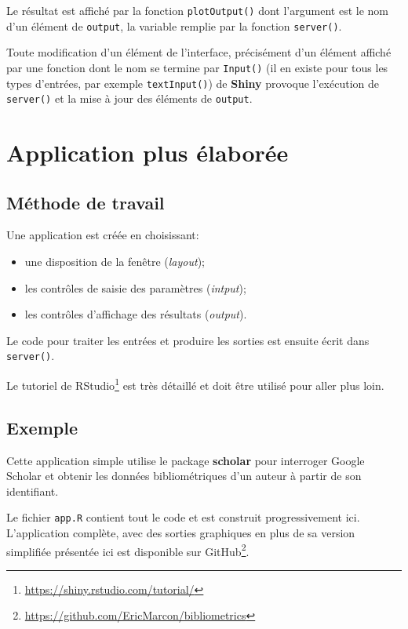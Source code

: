 \documentclass[
  12pt,
  french,
  a4paper,
  extrafontsizes,onecolumn,openright
  ]{memoir}
\providecommand{\tightlist}{%
  \setlength{\itemsep}{0pt}\setlength{\parskip}{0pt}}
\newlength{\rf}
\begin{document}
Le résultat est affiché par la fonction \texttt{plotOutput()} dont l'argument est le nom d'un élément de \texttt{output}, la variable remplie par la fonction \texttt{server()}.

Toute modification d'un élément de l'interface, précisément d'un élément affiché par une fonction dont le nom se termine par \texttt{Input()} (il en existe pour tous les types d'entrées, par exemple \texttt{textInput()}) de \textbf{Shiny} provoque l'exécution de \texttt{server()} et la mise à jour des éléments de \texttt{output}.

\section{Application plus élaborée}\label{application-plus-uxe9laboruxe9e}

\subsection{Méthode de travail}\label{muxe9thode-de-travail}

Une application est créée en choisissant:

\begin{itemize}
\tightlist
\item
  une disposition de la fenêtre (\emph{layout});
\item
  les contrôles de saisie des paramètres (\emph{intput});
\item
  les contrôles d'affichage des résultats (\emph{output}).
\end{itemize}

Le code pour traiter les entrées et produire les sorties est ensuite écrit dans \texttt{server()}.

Le tutoriel de RStudio\footnote{\url{https://shiny.rstudio.com/tutorial/}} est très détaillé et doit être utilisé pour aller plus loin.

\subsection{Exemple}\label{exemple}

Cette application simple utilise le package \textbf{scholar} pour interroger Google Scholar et obtenir les données bibliométriques d'un auteur à partir de son identifiant.

Le fichier \texttt{app.R} contient tout le code et est construit progressivement ici.
L'application complète, avec des sorties graphiques en plus de sa version simplifiée présentée ici est disponible sur GitHub\footnote{\url{https://github.com/EricMarcon/bibliometrics}}.
\end{document}

